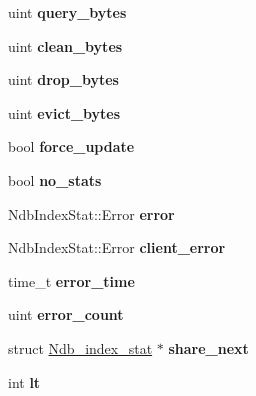 \begin{DoxyCompactItemize}
uint {\bfseries query\+\_\+bytes}
\item 
\mbox{\label{structNdb__index__stat_ac3683786d19d835b9ff2bba8fa9cc9be}} 
uint {\bfseries clean\+\_\+bytes}
\item 
\mbox{\label{structNdb__index__stat_a7c6b0e5ed26e61a210b9c7ab6f651a77}} 
uint {\bfseries drop\+\_\+bytes}
\item 
\mbox{\label{structNdb__index__stat_a8194bb6ca4c5a76caed54b4acf8e6946}} 
uint {\bfseries evict\+\_\+bytes}
\item 
\mbox{\label{structNdb__index__stat_ad0e2f69383bfc03f79c0b48cbe2e3e8c}} 
bool {\bfseries force\+\_\+update}
\item 
\mbox{\label{structNdb__index__stat_a0df626d1c79e8eef18e8cab3f1d637cf}} 
bool {\bfseries no\+\_\+stats}
\item 
\mbox{\label{structNdb__index__stat_a6d1767a9c8689cd5a1394c1578f7bcfd}} 
Ndb\+Index\+Stat\+::\+Error {\bfseries error}
\item 
\mbox{\label{structNdb__index__stat_aa3fd3e01e47d32bf4564180112eb6510}} 
Ndb\+Index\+Stat\+::\+Error {\bfseries client\+\_\+error}
\item 
\mbox{\label{structNdb__index__stat_aeba986dbce303565ecad0994d3c59904}} 
time\+\_\+t {\bfseries error\+\_\+time}
\item 
\mbox{\label{structNdb__index__stat_a64c8bfe28b255a10c06b84812a213f55}} 
uint {\bfseries error\+\_\+count}
\item 
\mbox{\label{structNdb__index__stat_a5b19398316a1fc5669546adb561ad7b1}} 
struct \mbox{\hyperlink{structNdb__index__stat}{Ndb\+\_\+index\+\_\+stat}} $\ast$ {\bfseries share\+\_\+next}
\item 
\mbox{\label{structNdb__index__stat_a4629403265ef7e917399e085592f8ebe}} 
int {\bfseries lt}
\item 

\end{DoxyCompactItemize}
